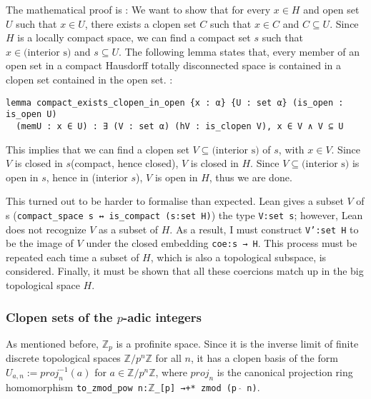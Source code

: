 \documentclass[a4paper,UKenglish,cleveref, autoref, thm-restate]{lipics-v2021}
\newcommand{\lean}[1]{\texttt{#1}\xspace} %
\begin{document}
The mathematical proof is : We want to show that for every $x \in H$ and open set $U$ such that
$x \in U$, there exists a clopen set $C$ such that $x \in C$ and $C \subseteq U$. Since $H$ is a
locally compact space, we can find a compact set $s$ such that $x \in \text{(interior s)}$ and
$s \subseteq U$. The following lemma states that, every member of an open set in a compact Hausdorff 
totally disconnected space is contained in a clopen set contained in the open set. :
\begin{lstlisting}
lemma compact_exists_clopen_in_open {x : α} {U : set α} (is_open : is_open U) 
  (memU : x ∈ U) : ∃ (V : set α) (hV : is_clopen V), x ∈ V ∧ V ⊆ U
\end{lstlisting}
This implies that we can find a clopen set $V \subseteq \text{(interior s)}$ of $s$, with $x \in V$. 
Since $V$ is closed in $s$(compact, hence closed), $V$ is closed in $H$. Since
$V \subseteq \text{(interior s)}$ is open in $s$, hence in (interior $s$), $V$ is open in $H$, thus
we are done. 

This turned out to be harder to formalise than expected. Lean gives a subset $V$ of s \newline (\lean{compact\_space s ↔ is\_compact (s:set H)}) 
the type \lean{V:set s}; however, Lean does not recognize $V$ as a subset of $H$. As a result, I must construct \lean{V':set H} 
to be the image of $V$ under the closed embedding \lean{coe:s → H}. This process must be repeated each time a subset of $H$, 
which is also a topological subspace, is considered. Finally, it must be shown that all these coercions match up in the big 
topological space $H$.


\subsubsection{Clopen sets of the $p$-adic integers}
As mentioned before, $\mathbb{Z}_p$ is a profinite space. Since it is the inverse limit of finite
discrete topological spaces $\mathbb{Z}/p^n \mathbb{Z}$ for all $n$, it has a clopen basis of the
form $U_{a,n} := proj_n ^{-1} (a)$ for $a \in \mathbb{Z}/p^n \mathbb{Z}$, where $proj_n$ is the
canonical projection ring homomorphism \lean{to\_zmod\_pow n:$\mathbb{Z}$\_[p] →+* zmod (p $\hat{}$ n)}. 
\end{document}
